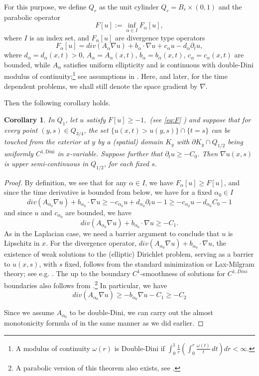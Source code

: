 \documentclass[11pt,reqno]{amsart}
\theoremstyle{plain}
\newtheorem{cor}[thm]{Corollary}
\theoremstyle{remark}
\numberwithin{equation}{section}
\begin{document}
For this purpose, we define $Q_r$ as the unit cylinder  $Q_r= B_r \times (0,1)$ and the  parabolic operator
\begin{equation}\label{eq:F}
    F[u] := \inf_{\alpha \in I} F_{\alpha} [u],
\end{equation}
where $I$ is an index set, and  $F_\alpha [u]$ are divergence type operators
$$
F_\alpha [u]  =div(A_\alpha \nabla u) + b_\alpha \cdot \nabla u + c_\alpha  u - d_\alpha \partial_t u ,
$$
where  $d_\alpha=d_\alpha(x,t)  > 0$, $A_\alpha=A_\alpha(x,t)$, $b_\alpha=b_\alpha(x,t)$,  $c_\alpha=c_\alpha(x,t)$  are bounded, 
while  $A_\alpha $  satisfies uniform ellipticity and is continuous with double-Dini modulus of continuity;\footnote{A modulus of continuity $\omega (r)$ is  Double-Dini if 
$\int_0^1 \frac{1}{r}\left( \int_0^r \frac{\omega(t)}{t}\,dt \right) dr < \infty.$
 }
see  assumptions in \cite{Mat-Pet}. Here, and later, for the time dependent problems, we shall  still denote the space gradient by $\nabla $. 

Then the following corollary holds. 

\begin{cor}\label{cor:heat}
In $Q_1$,  let $u$ satisfy         $F[u]  \geq -1, $ (see \eqref{eq:F} 
)   and suppose that for every point $(y,s) \in Q_{3/4}$, the  set $\{ u(x,t) > u(y,s)\}  \cap \{t=s\} $
can be touched from the exterior at $y$ by a (spatial) domain  $K_y$ with $\partial K_y \cap Q_{1/2}$ being 
uniformly  $C^{1,\text{Dini}}$ in $x$-variable. Suppose further that $\partial_t u \geq -C_0$.
Then $\nabla u (x , s)$ is upper semi-continuous in $Q_{1/2}$, for each fixed $s$.
\end{cor}


\begin{proof}
By definition, we see that for any $\alpha \in I$, we have 
$F_\alpha[u] \geq  F [u]$, and since  the time derivative is bounded from below, we have for a fixed  $\alpha_0 \in I$
$$
div(A_{\alpha_0}  \nabla u)  + b_{\alpha_0} \cdot \nabla u \geq  - c_{\alpha_0}  u +  d_{\alpha_0} \partial_t u -1 \geq  - c_{\alpha_0}  u -d_{\alpha_0} C_0 -1
$$
and since $u$ and $c_{\alpha_0} $ are bounded, we have 
$$
div(A_{\alpha_0}  \nabla u)  + b_{\alpha_0}  \cdot \nabla u \geq   -C_1.
$$
As in  the Laplacian case, we need  a barrier argument to conclude that $u$ is Lipschitz in $x$. 
For the divergence operator,  
$div(A_{\alpha_0} \nabla u)   + b_{\alpha_0}\cdot \nabla u $, the existence of weak solutions to the (elliptic)  Dirichlet problem, serving as a barrier to $u(x,s)$, with $s$ fixed, follows from the standard minimization or Lax-Milgram theory; see e.g. \cite[Section 6.2]{Evans}.
The up to the boundary  $C^1$-smoothness of solutions  for $C^{1,Dini}$ boundaries also follows from    \cite[Theorem 1.3]{Dong-2018}.\footnote{A parabolic version of this theorem also exists, see  \cite[Theorem 1.1]{Dong-2021}.} 
In particular, we have 
$$
div(A_{\alpha_0}  \nabla u ) \geq -     b_{\alpha_0} \nabla u   -C_1 \geq -C_2
$$


Since we assume $A_{\alpha_0}$ to be double-Dini, we can carry out   the almost monotonicity formula of   \cite[Theorem IV]{Mat-Pet} in the same manner as we did earlier. 
\end{proof}
\end{document}
